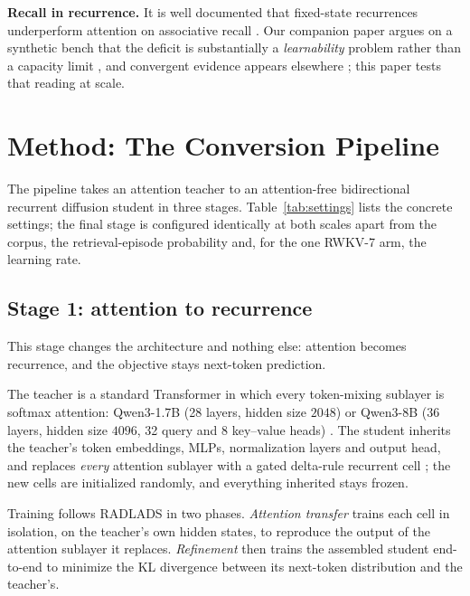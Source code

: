 \documentclass{article}
\begin{document}
\textbf{Recall in recurrence.} It is well documented that fixed-state recurrences underperform attention on associative recall \citep{arora2023zoology,arora2024based}. Our companion paper argues on a synthetic bench that the deficit is substantially a \emph{learnability} problem rather than a capacity limit \citep{anatomyrecall}, and convergent evidence appears elsewhere \citep{okpekpe2025recall,blouir2024birdie}; this paper tests that reading at scale.

\section{Method: The Conversion Pipeline}\label{sec:pipeline}

The pipeline takes an attention teacher to an attention-free bidirectional recurrent diffusion student in three stages. Table~\ref{tab:settings} lists the concrete settings; the final stage is configured identically at both scales apart from the corpus, the retrieval-episode probability and, for the one RWKV-7 arm, the learning rate.

\subsection{Stage 1: attention to recurrence}\label{sec:stage1}

This stage changes the architecture and nothing else: attention becomes recurrence, and the objective stays next-token prediction.

The teacher is a standard Transformer in which every token-mixing sublayer is softmax attention: Qwen3-1.7B (28 layers, hidden size $2048$) or Qwen3-8B (36 layers, hidden size $4096$, 32 query and 8 key--value heads) \citep{yang2025qwen3}. The student inherits the teacher's token embeddings, MLPs, normalization layers and output head, and replaces \emph{every} attention sublayer with a gated delta-rule recurrent cell \citep{yang2024gateddeltanet}; the new cells are initialized randomly, and everything inherited stays frozen.

Training follows RADLADS \citep{goldstein2025radlads} in two phases. \emph{Attention transfer} trains each cell in isolation, on the teacher's own hidden states, to reproduce the output of the attention sublayer it replaces. \emph{Refinement} then trains the assembled student end-to-end to minimize the KL divergence between its next-token distribution and the teacher's.
\end{document}
